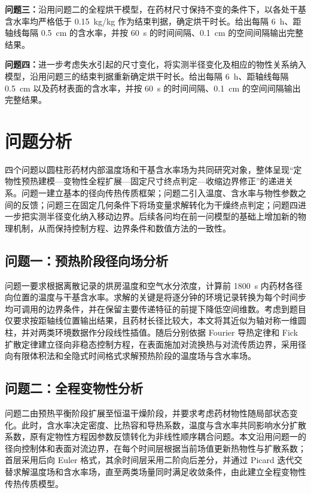 \documentclass[withoutpreface,bwprint]{cumcmthesis}
\begin{document}
\textbf{问题三：}沿用问题二的全程烘干模型，在药材尺寸保持不变的条件下，以各处干基含水率均严格低于 \SI{0.15}{kg/kg} 作为结束判据，确定烘干时长。给出每隔 \SI{6}{h}、距轴线每隔 \SI{0.5}{cm} 的含水率，并按 \SI{60}{s} 的时间间隔、\SI{0.1}{cm} 的空间间隔输出完整结果。

\textbf{问题四：}进一步考虑失水引起的尺寸变化，将实测半径变化及相应的物性关系纳入模型，沿用问题三的结束判据重新确定烘干时长。给出每隔 \SI{6}{h}、距轴线每隔 \SI{0.5}{cm} 以及药材表面的含水率，并按 \SI{60}{s} 的时间间隔、\SI{0.1}{cm} 的空间间隔输出完整结果。

\section{问题分析}

四个问题以圆柱形药材内部温度场和干基含水率场为共同研究对象，整体呈现“定物性预热建模—变物性全程扩展—固定尺寸终点判定—收缩边界修正”的递进关系。问题一建立基本的径向传热传质框架；问题二引入温度、含水率与物性参数之间的反馈；问题三在固定几何条件下将场变量求解转化为干燥终点判定；问题四进一步把实测半径变化纳入移动边界。后续各问均在前一问模型的基础上增加新的物理机制，从而保持控制方程、边界条件和数值方法的一致性。

\subsection{问题一：预热阶段径向场分析}

问题一要求根据离散记录的烘房温度和空气水分浓度，计算前 \SI{1800}{s} 内药材各径向位置的温度与干基含水率。求解的关键是将逐分钟的环境记录转换为每个时间步均可调用的边界条件，并在保留主要传递特征的前提下降低空间维数。考虑到题目仅要求按距轴线位置输出结果，且药材长径比较大，本文将其近似为轴对称一维圆柱，并对两类环境数据作分段线性插值。随后分别依据 Fourier 导热定律和 Fick 扩散定律建立径向非稳态控制方程，在表面施加对流换热与对流传质边界，采用径向有限体积法和全隐式时间格式求解预热阶段的温度场与含水率场。

\subsection{问题二：全程变物性分析}

问题二由预热平衡阶段扩展至恒温干燥阶段，并要求考虑药材物性随局部状态变化。此时，含水率决定密度、比热容和导热系数，温度与含水率共同影响水分扩散系数，原有定物性方程因参数反馈转化为非线性顺序耦合问题。本文沿用问题一的径向控制体和表面对流边界，在每个时间层根据当前场值更新热物性与扩散系数；首层采用后向 Euler 格式，其余时间层采用二阶向后差分，并通过 Picard 迭代交替求解温度场和含水率场，直至两类场量同时满足收敛条件，由此建立全程变物性传热传质模型。
\end{document}

